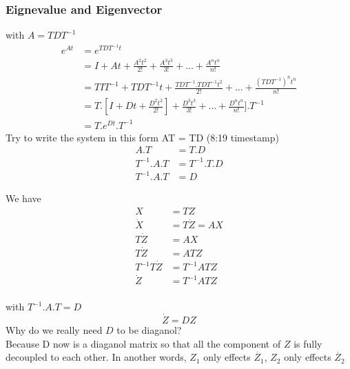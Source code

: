 \documentclass{article}
\begin{document}
\subsubsection{Eignevalue and Eigenvector}
with $A = TDT^{-1}$
\begin{equation}
  \begin{aligned}
    e^{At}  & = e^{TDT^{-1}t} \\
            & = I + At + \frac{ A^{2}t^{2} }{2!} + \frac{ A^{3}t^{3} }{3!} + \ldots + \frac{ A^{n}t^{n} }{n!} \\
            & = TIT^{-1} + TDT^{-1}t + \frac{ TDT^{-1}.TDT^{-1}t^{2} }{2!} + \ldots + \frac{ (TDT^{-1})^{n}t^{n} }{n!}\\
            & = T.[I + Dt + \frac{D^{2}t^2}{2!}] + \frac{D^{3}t^3}{3!} + \ldots + \frac{D^{n}t^{n}}{n!} ].T^{-1}\\
            & = T.e^{Dt}.T^{-1}
  \end{aligned}
\end{equation}  
Try to write the system in this form AT = TD (8:19 timestamp)
\begin{equation}
  \begin{aligned}
    A.T  & = T.D \\
    T^{-1}.A.T  & = T^{-1}.T.D \\
    T^{-1}.A.T & = D
  \end{aligned}  
\end{equation} 

We have
\begin{equation}
  \begin{aligned}
    X &= TZ \\
    \dot{X} &= T\dot{Z} = AX \\
    T\dot{Z} &= AX \\
    T\dot{Z} &= ATZ \\
    T^{-1}T\dot{Z} &= T^{-1}ATZ \\
    \dot{Z} &= T^{-1}ATZ \\
  \end{aligned}  
\end{equation} 

with $ T^{-1}.A.T = D $
\begin{equation}
  \dot{Z} = DZ
\end{equation}
Why do we really need $D$ to be diaganol?
\\Because D now is a diaganol matrix 
so that all the component of $Z$ is fully decoupled to each other.
In another words,
$Z_{1}$ only effects $\dot{Z_{1}}$, $Z_{2}$ only effects $\dot{Z_{2}}$
\end{document}
